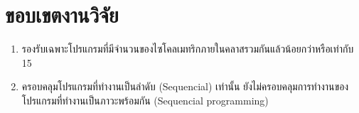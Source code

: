 \section{ขอบเขตงานวิจัย}

\begin{enumerate}
    \item รองรับเฉพาะโปรแกรมที่มีจำนวนของไซโคลเมทริกภายในคลาสรวมกันแล้วน้อยกว่าหรือเท่ากับ 15
    \item ครอบคลุมโปรแกรมที่ทำงานเป็นลำดับ (Sequencial) เท่านั้น ยังไม่ครอบคลุมการทำงานของโปรแกรมที่ทำงานเป็นภาวะพร้อมกัน (Sequencial programming)
\end{enumerate}
